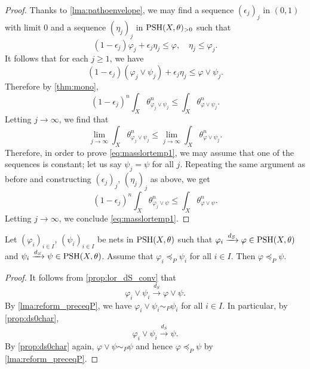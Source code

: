 \begin{proof}
Thanks to \cref{lma:pathoenvelope}, we may find a sequence $(\epsilon_j)_j$ in $(0,1)$ with limit $0$ and a sequence $(\eta_j)_j$ in $\mathrm{PSH}(X,\theta)_{>0}$ such that
\[
    (1-\epsilon_j)\varphi_j+\epsilon_j \eta_j \leq \varphi,\quad \eta_j \leq \varphi_j.
\]
It follows that for each $j\geq 1$, we have
\[
(1-\epsilon_j)(\varphi_j\lor \psi_j)+\epsilon_j \eta_j \leq \varphi \lor \psi_j.
\]
Therefore by \cref{thm:mono},
\[
(1-\epsilon_j)^n \int_X \theta_{\varphi_j\lor \psi_j}^n\leq \int_X \theta_{\varphi \lor \psi_j}^n.
\]
Letting $j\to\infty$, we find that
\[
\lim_{j\to\infty}\int_X \theta_{\varphi_j\lor \psi_j}^n\leq \lim_{j\to\infty}\int_X \theta_{\varphi\lor \psi_j}^n.
\]
Therefore, in order to prove \eqref{eq:masslortemp1}, we may assume that one of the sequences is constant; let us say $\psi_j=\psi$ for all $j$. Repeating the same argument as before and constructing $(\epsilon_j)_j$, $(\eta_j)_j$ as above, we get
\[
(1-\epsilon_j)^n \int_X \theta_{\varphi_j\lor \psi}^n\leq \int_X \theta_{\varphi \lor \psi}^n.
\]
Letting $j\to\infty$, we conclude \eqref{eq:masslortemp1}.
\end{proof}


\begin{proposition}\label{prop:dsconvpresorder}
    Let $(\varphi_i)_{i\in I}$, $(\psi_i)_{i\in I}$ be nets in $\mathrm{PSH}(X,\theta)$ such that $\varphi_i\xrightarrow{d_S} \varphi\in \mathrm{PSH}(X,\theta)$ and $\psi_i\xrightarrow{d_S}\psi\in \mathrm{PSH}(X,\theta)$. Assume that $\varphi_i\preceq_P \psi_i$ for all $i\in I$. Then $\varphi\preceq_P \psi$.
\end{proposition}
\begin{proof}
    It follows from \cref{prop:lor_dS_conv} that
    \[
        \varphi_i\lor\psi_i\xrightarrow{d_S}\varphi\lor \psi.
    \]
    By \cref{lma:reform_preceqP}, we have $\varphi_i\lor\psi_i\sim_P \psi_i$ for all $i\in I$. In particular, by \cref{prop:ds0char},
    \[
        \varphi_i\lor\psi_i\xrightarrow{d_S}\psi.
    \]
    By \cref{prop:ds0char} again, $\varphi\lor\psi\sim_P\psi$ and hence $\varphi\preceq_P \psi$ by \cref{lma:reform_preceqP}.
\end{proof}

